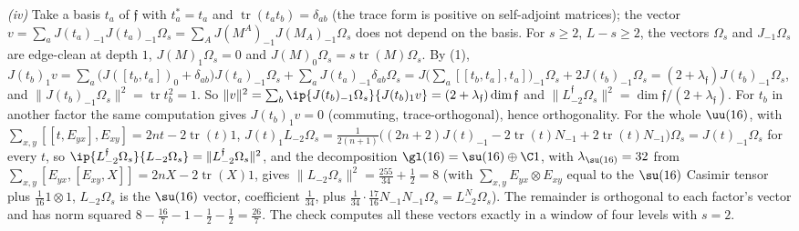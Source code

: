 \emph{(iv)} Take a basis $t_{a}$ of $\mathfrak{f}$ with $t_{a}^{*} = t_{a}$ and $\operatorname{tr}(t_{a}t_{b}) = \delta_{ab}$ (the trace form is positive on self-adjoint matrices); the vector $v = \sum_{a}J(t_{a})_{-1}J(t_{a})_{-1}\Omega_{s} = \sum_{A}J(M^{A})_{-1}J(M_{A})_{-1}\Omega_{s}$ does not depend on the basis. For $s \ge 2$, $L - s \ge 2$, the vectors $\Omega_{s}$ and $J_{-1}\Omega_{s}$ are edge-clean at depth $1$, $J(M)_{1}\Omega_{s} = 0$ and $J(M)_{0}\Omega_{s} = s\operatorname{tr}(M)\Omega_{s}$. By (1), $J(t_{b})_{1}v = \sum_{a}\bigl(J([t_{b}, t_{a}])_{0} + \delta_{ab}\bigr)J(t_{a})_{-1}\Omega_{s} + \sum_{a}J(t_{a})_{-1}\delta_{ab}\Omega_{s} = J\bigl(\textstyle\sum_{a}[[t_{b}, t_{a}], t_{a}]\bigr)_{-1}\Omega_{s} + 2J(t_{b})_{-1}\Omega_{s} = (2 + \lambda_{\mathfrak{f}})J(t_{b})_{-1}\Omega_{s}$, and $\|J(t_{b})_{-1}\Omega_{s}\|^{2} = \operatorname{tr}t_{b}^{2} = 1$. So $\|v\|^{2} = \sum_{b}\ip{J(t_{b})_{-1}\Omega_{s}}{J(t_{b})_{1}v} = (2 + \lambda_{\mathfrak{f}})\dim\mathfrak{f}$ and $\|L^{\mathfrak{f}}_{-2}\Omega_{s}\|^{2} = \dim\mathfrak{f}/(2 + \lambda_{\mathfrak{f}})$. For $t_{b}$ in another factor the same computation gives $J(t_{b})_{1}v = 0$ (commuting, trace-orthogonal), hence orthogonality. For the whole $\uu(16)$, with $\sum_{x,y}[[t, E_{yx}], E_{xy}] = 2nt - 2\operatorname{tr}(t)1$, $J(t)_{1}L_{-2}\Omega_{s} = \tfrac{1}{2(n + 1)}\bigl((2n + 2)J(t)_{-1} - 2\operatorname{tr}(t)N_{-1} + 2\operatorname{tr}(t)N_{-1}\bigr)\Omega_{s} = J(t)_{-1}\Omega_{s}$ for every $t$, so $\ip{L^{\mathfrak{f}}_{-2}\Omega_{s}}{L_{-2}\Omega_{s}} = \|L^{\mathfrak{f}}_{-2}\Omega_{s}\|^{2}$, and the decomposition $\gl(16) = \su(16) \oplus \C 1$, with $\lambda_{\su(16)} = 32$ from $\sum_{x,y}[E_{yx}, [E_{xy}, X]] = 2nX - 2\operatorname{tr}(X)1$, gives $\|L_{-2}\Omega_{s}\|^{2} = \tfrac{255}{34} + \tfrac12 = 8$ (with $\sum_{x,y}E_{yx}\otimes E_{xy}$ equal to the $\su(16)$ Casimir tensor plus $\tfrac{1}{16}1\otimes 1$, $L_{-2}\Omega_{s}$ is the $\su(16)$ vector, coefficient $\tfrac{1}{34}$, plus $\tfrac{1}{34}\cdot\tfrac{17}{16}N_{-1}N_{-1}\Omega_{s} = L^{N}_{-2}\Omega_{s}$). The remainder is orthogonal to each factor's vector and has norm squared $8 - \tfrac{16}{7} - 1 - \tfrac12 - \tfrac12 = \tfrac{26}{7}$. The check computes all these vectors exactly in a window of four levels with $s = 2$.
